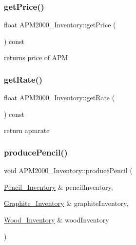 \subsubsection{\texorpdfstring{getPrice()}{getPrice()}}
{\footnotesize\ttfamily float A\+P\+M2000\+\_\+\+Inventory\+::get\+Price (\begin{DoxyParamCaption}{ }\end{DoxyParamCaption}) const}



returns price of A\+PM 

\mbox{\label{classAPM2000__Inventory_a989cd77e09fcdc6bb6a6b9e5d2e6f481}} 
\subsubsection{\texorpdfstring{getRate()}{getRate()}}
{\footnotesize\ttfamily float A\+P\+M2000\+\_\+\+Inventory\+::get\+Rate (\begin{DoxyParamCaption}{ }\end{DoxyParamCaption}) const}



return apmrate 

\mbox{\label{classAPM2000__Inventory_ad7ffc7e7536509d26d76800b2398bfc0}} 
\subsubsection{\texorpdfstring{producePencil()}{producePencil()}}
{\footnotesize\ttfamily void A\+P\+M2000\+\_\+\+Inventory\+::produce\+Pencil (\begin{DoxyParamCaption}\item[{\mbox{\hyperlink{classPencil__Inventory}{Pencil\+\_\+\+Inventory}} \&}]{pencil\+Inventory,  }\item[{\mbox{\hyperlink{classGraphite__Inventory}{Graphite\+\_\+\+Inventory}} \&}]{graphite\+Inventory,  }\item[{\mbox{\hyperlink{classWood__Inventory}{Wood\+\_\+\+Inventory}} \&}]{wood\+Inventory }\end{DoxyParamCaption})}



